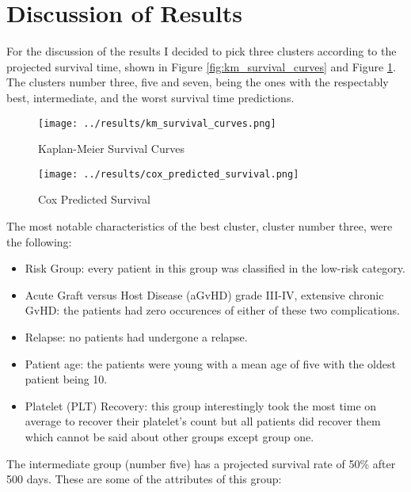 \documentclass[a4paper,12pt]{article}
\begin{document}
\section{Discussion of Results}

For the discussion of the results I decided to pick three clusters according to the projected survival time, shown in Figure \ref{fig:km_survival_curves} and Figure \ref{fig:cox_predicted_survival}. The clusters number three, five and seven, being the ones with the respectably best, intermediate, and the worst survival time predictions.

\begin{figure}[h]
  \centering
  \begin{minipage}{0.48\textwidth}
    \centering
    \texttt{[image: ../results/km\_survival\_curves.png]}
    \caption{Kaplan-Meier Survival Curves}
    \label{fig:km_survival_curves}
  \end{minipage}
  \begin{minipage}{0.48\textwidth}
    \centering
    \texttt{[image: ../results/cox\_predicted\_survival.png]}
    \caption{Cox Predicted Survival}
    \label{fig:cox_predicted_survival}
  \end{minipage}\hfill
\end{figure}

\vspace{0.5cm}
\noindent
The most notable characteristics of the best cluster, cluster number three, were the following:

\begin{itemize}
  \item Risk Group: every patient in this group was classified in the low-risk category.
  \item Acute Graft versus Host Disease (aGvHD) grade III-IV, extensive chronic GvHD: the patients had zero occurences of either of these two complications.
  \item Relapse: no patients had undergone a relapse.
  \item Patient age: the patients were young with a mean age of five with the oldest patient being 10.
  \item Platelet (PLT) Recovery: this group interestingly took the most time on average to recover their platelet's count but all patients did recover them which cannot be said about other groups except group one.
\end{itemize}

\noindent
The intermediate group (number five) has a projected survival rate of 50\% after 500 days. These are some of the attributes of this group:
\end{document}
